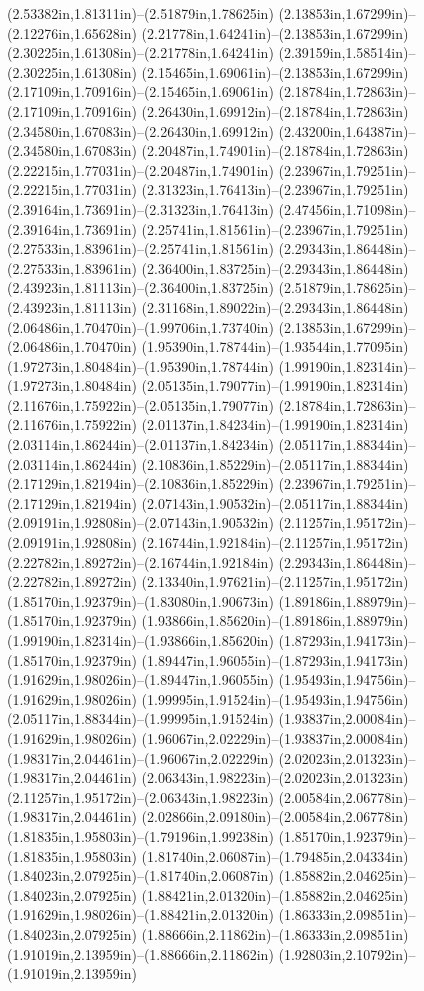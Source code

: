 (2.53382in,1.81311in)--(2.51879in,1.78625in) (2.13853in,1.67299in)--(2.12276in,1.65628in) (2.21778in,1.64241in)--(2.13853in,1.67299in) (2.30225in,1.61308in)--(2.21778in,1.64241in) (2.39159in,1.58514in)--(2.30225in,1.61308in) (2.15465in,1.69061in)--(2.13853in,1.67299in) (2.17109in,1.70916in)--(2.15465in,1.69061in) (2.18784in,1.72863in)--(2.17109in,1.70916in) (2.26430in,1.69912in)--(2.18784in,1.72863in) (2.34580in,1.67083in)--(2.26430in,1.69912in) (2.43200in,1.64387in)--(2.34580in,1.67083in) (2.20487in,1.74901in)--(2.18784in,1.72863in) (2.22215in,1.77031in)--(2.20487in,1.74901in) (2.23967in,1.79251in)--(2.22215in,1.77031in) (2.31323in,1.76413in)--(2.23967in,1.79251in) (2.39164in,1.73691in)--(2.31323in,1.76413in) (2.47456in,1.71098in)--(2.39164in,1.73691in) (2.25741in,1.81561in)--(2.23967in,1.79251in) (2.27533in,1.83961in)--(2.25741in,1.81561in) (2.29343in,1.86448in)--(2.27533in,1.83961in) (2.36400in,1.83725in)--(2.29343in,1.86448in) (2.43923in,1.81113in)--(2.36400in,1.83725in) (2.51879in,1.78625in)--(2.43923in,1.81113in) (2.31168in,1.89022in)--(2.29343in,1.86448in) (2.06486in,1.70470in)--(1.99706in,1.73740in) (2.13853in,1.67299in)--(2.06486in,1.70470in) (1.95390in,1.78744in)--(1.93544in,1.77095in) (1.97273in,1.80484in)--(1.95390in,1.78744in) (1.99190in,1.82314in)--(1.97273in,1.80484in) (2.05135in,1.79077in)--(1.99190in,1.82314in) (2.11676in,1.75922in)--(2.05135in,1.79077in) (2.18784in,1.72863in)--(2.11676in,1.75922in) (2.01137in,1.84234in)--(1.99190in,1.82314in) (2.03114in,1.86244in)--(2.01137in,1.84234in) (2.05117in,1.88344in)--(2.03114in,1.86244in) (2.10836in,1.85229in)--(2.05117in,1.88344in) (2.17129in,1.82194in)--(2.10836in,1.85229in) (2.23967in,1.79251in)--(2.17129in,1.82194in) (2.07143in,1.90532in)--(2.05117in,1.88344in) (2.09191in,1.92808in)--(2.07143in,1.90532in) (2.11257in,1.95172in)--(2.09191in,1.92808in) (2.16744in,1.92184in)--(2.11257in,1.95172in) (2.22782in,1.89272in)--(2.16744in,1.92184in) (2.29343in,1.86448in)--(2.22782in,1.89272in) (2.13340in,1.97621in)--(2.11257in,1.95172in) (1.85170in,1.92379in)--(1.83080in,1.90673in) (1.89186in,1.88979in)--(1.85170in,1.92379in) (1.93866in,1.85620in)--(1.89186in,1.88979in) (1.99190in,1.82314in)--(1.93866in,1.85620in) (1.87293in,1.94173in)--(1.85170in,1.92379in) (1.89447in,1.96055in)--(1.87293in,1.94173in) (1.91629in,1.98026in)--(1.89447in,1.96055in) (1.95493in,1.94756in)--(1.91629in,1.98026in) (1.99995in,1.91524in)--(1.95493in,1.94756in) (2.05117in,1.88344in)--(1.99995in,1.91524in) (1.93837in,2.00084in)--(1.91629in,1.98026in) (1.96067in,2.02229in)--(1.93837in,2.00084in) (1.98317in,2.04461in)--(1.96067in,2.02229in) (2.02023in,2.01323in)--(1.98317in,2.04461in) (2.06343in,1.98223in)--(2.02023in,2.01323in) (2.11257in,1.95172in)--(2.06343in,1.98223in) (2.00584in,2.06778in)--(1.98317in,2.04461in) (2.02866in,2.09180in)--(2.00584in,2.06778in) (1.81835in,1.95803in)--(1.79196in,1.99238in) (1.85170in,1.92379in)--(1.81835in,1.95803in) (1.81740in,2.06087in)--(1.79485in,2.04334in) (1.84023in,2.07925in)--(1.81740in,2.06087in) (1.85882in,2.04625in)--(1.84023in,2.07925in) (1.88421in,2.01320in)--(1.85882in,2.04625in) (1.91629in,1.98026in)--(1.88421in,2.01320in) (1.86333in,2.09851in)--(1.84023in,2.07925in) (1.88666in,2.11862in)--(1.86333in,2.09851in) (1.91019in,2.13959in)--(1.88666in,2.11862in) (1.92803in,2.10792in)--(1.91019in,2.13959in) 